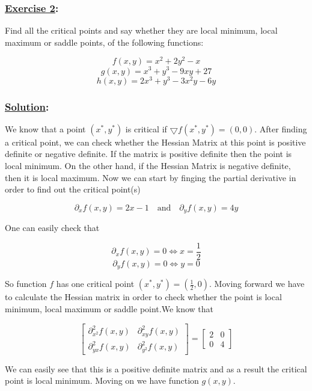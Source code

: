 \documentclass[
]{article}
\begin{document}
\hypertarget{section-2}{%
\subsubsection{\texorpdfstring{\underline{Exercise 2}:}{:}}\label{section-2}}

Find all the critical points and say whether they are local minimum,
local maximum or saddle points, of the following functions:

\[
f(x,y)=x^2+2y^2-x
\] \[
g(x,y)=x^3+y^3-9xy+27
\] \[
h(x,y)=2x^3+y^3-3x^2y-6y
\]

\hypertarget{section-3}{%
\subsubsection{\texorpdfstring{\underline{Solution}:}{:}}\label{section-3}}

We know that a point \((x^*,y^*)\) is critical if
\(\bigtriangledown f(x^*,y^*)=(0,0)\). After finding a critical point,
we can check whether the Hessian Matrix at this point is positive
definite or negative definite. If the matrix is positive definite then
the point is local minimum. On the other hand, if the Hessian Matrix is
negative definite, then it is local maximum. Now we can start by finging
the partial derivative in order to find out the critical point(s)

\[
\partial_xf(x,y) = 2x - 1\quad\text{and}\quad\partial_yf(x,y) = 4y
\]

One can easily check that

\[
\partial_xf(x,y) = 0 \Leftrightarrow x =\frac{1}{2}
\] \[
\partial_yf(x,y) = 0 \Leftrightarrow y = 0
\]

So function \(f\) has one critical point \((x^*,y^*)=(\frac{1}{2},0)\).
Moving forward we have to calculate the Hessian matrix in order to check
whether the point is local minimum, local maximum or saddle point.We
know that

\[
\begin{bmatrix}
\partial_{x^2}^2f(x,y) & \partial_{xy}^2f(x,y)\\
\partial_{yx}^2f(x,y) & \partial_{y^2}^2f(x,y)
\end{bmatrix} = \begin{bmatrix}
2 & 0 \\
0 & 4
\end{bmatrix}
\]

We can easily see that this is a positive definite matrix and as a
result the critical point is local minimum. Moving on we have function
\(g(x,y)\).
\end{document}

